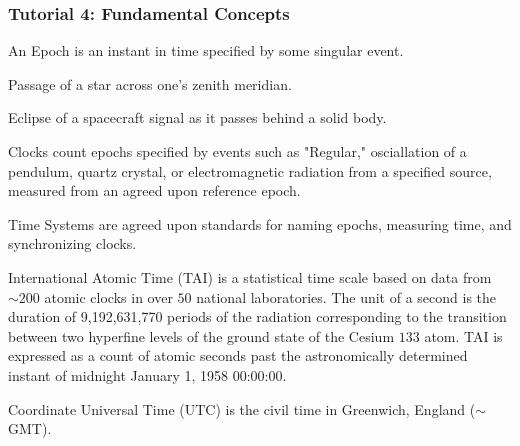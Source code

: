 \documentclass[crop=false,class=article,oneside]{standalone}
\begin{document}
        \subsubsection{Tutorial 4: Fundamental Concepts}
            \begin{definition}
                An Epoch is an instant in time specified
                by some singular event.
            \end{definition}
            \begin{example}
                Passage of a star across one's zenith meridian.
            \end{example}
            \begin{example}
                Eclipse of a spacecraft signal as it passes
                behind a solid body.
            \end{example}
            \begin{remark}
                Clocks count epochs specified by events such
                as "Regular," osciallation of a pendulum,
                quartz crystal, or electromagnetic radiation
                from a specified source, measured from an
                agreed upon reference epoch.
            \end{remark}
            \begin{definition}
                Time Systems are agreed upon standards for
                naming epochs, measuring time, and
                synchronizing clocks.
            \end{definition}
            \begin{definition}
                International Atomic Time (TAI) is a
                statistical time scale based on data from
                $\sim200$ atomic clocks in over $50$ national
                laboratories. The unit of a second is the
                duration of 9,192,631,770 periods of the
                radiation corresponding to the transition
                between two hyperfine levels of the ground
                state of the Cesium $133$ atom. TAI is
                expressed as a count of atomic seconds past
                the astronomically determined instant of
                midnight January 1, 1958 00:00:00.
            \end{definition}
            \begin{definition}
                Coordinate Universal Time (UTC) is the civil
                time in Greenwich, England ($\sim$GMT).
            \end{definition}
\end{document}
